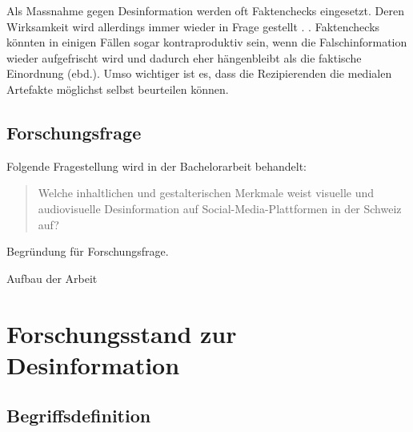 \documentclass[12pt,a4paper]{article}        %
\begin{document}
Als Massnahme gegen Desinformation werden oft Faktenchecks eingesetzt. Deren Wirksamkeit wird allerdings immer wieder in Frage gestellt \parencites[1095]{lazer_science_2018}[4f]{ceron_fake_2021}.  \parencites[1095]{lazer_science_2018}\parencite[vgl.\ auch][18]{grujic_warnhinweise_2024}. Faktenchecks könnten in einigen Fällen sogar kontraproduktiv sein, wenn  die Falschinformation wieder aufgefrischt wird und dadurch eher hängenbleibt als die faktische Einordnung (ebd.). Umso wichtiger ist es, dass die Rezipierenden die medialen Artefakte möglichst selbst beurteilen können.

\subsection{Forschungsfrage}
Folgende Fragestellung wird in der Bachelorarbeit behandelt:

\begin{quote}
  Welche inhaltlichen und gestalterischen Merkmale weist visuelle und audiovisuelle Desinformation auf Social-Media-Plattformen in der Schweiz auf?
\end{quote}
\color{red}Begründung für Forschungsfrage.

\color{red}Aufbau der Arbeit 
\color{black}
\pagebreak
\section{Forschungsstand zur Desinformation}


\subsection{Begriffsdefinition}
\end{document}
